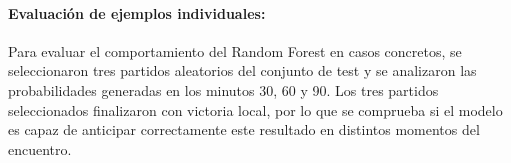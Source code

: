 \paragraph{Evaluación de ejemplos individuales:}

Para evaluar el comportamiento del Random Forest en casos concretos, se seleccionaron tres partidos aleatorios del conjunto de test y se analizaron las probabilidades generadas en los minutos 30, 60 y 90. Los tres partidos seleccionados finalizaron con victoria local, por lo que se comprueba si el modelo es capaz de anticipar correctamente este resultado en distintos momentos del encuentro.

\begin{table}[H]
    \centering
    \caption{Evolución de las probabilidades predichas por Random Forest en tres partidos del conjunto de test}
    \label{tab:rf_ejemplos_evolucion}
\end{table}

